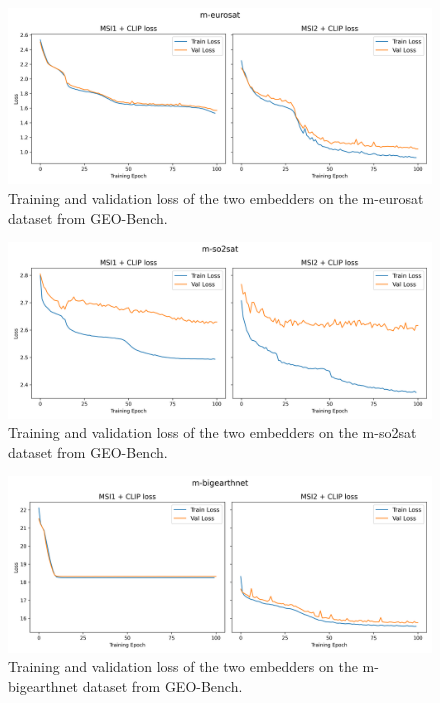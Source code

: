 \documentclass[a4paper, oneside, english]{sapthesis}
\begin{document}
\begin{figure}[h]
    \centering
    \includegraphics[width=\textwidth]{img/m-eurosat_loss_plot.png}
    \caption{Training and validation loss of the two embedders on the m-eurosat dataset from GEO-Bench.}
    \label{fig:meurosatloss}
\end{figure}

\begin{figure}[h]
    \centering
    \includegraphics[width=\textwidth]{img/m-so2sat_loss_plot.png}
    \caption{Training and validation loss of the two embedders on the m-so2sat dataset from GEO-Bench.}
    \label{fig:so2satloss}
\end{figure}

\begin{figure}[h]
    \centering
    \includegraphics[width=\textwidth]{img/m-bigearthnet_loss_plot.png}
    \caption{Training and validation loss of the two embedders on the m-bigearthnet dataset from GEO-Bench.}
    \label{fig:benloss}
\end{figure}
\end{document}
